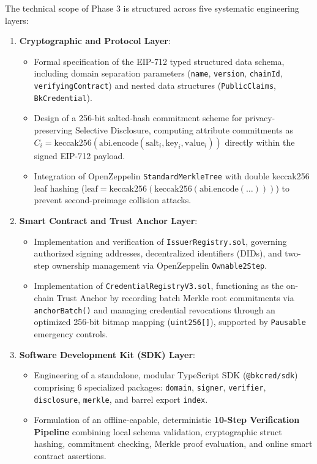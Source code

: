 The technical scope of Phase 3 is structured across five systematic engineering layers:

\begin{enumerate}
    \item \textbf{Cryptographic and Protocol Layer}:
    \begin{itemize}
        \item Formal specification of the EIP-712 typed structured data schema, including domain separation parameters (\texttt{name}, \texttt{version}, \texttt{chainId}, \texttt{verifyingContract}) and nested data structures (\texttt{PublicClaims}, \texttt{BkCredential}).
        \item Design of a 256-bit salted-hash commitment scheme for privacy-preserving Selective Disclosure, computing attribute commitments as $C_i = \text{keccak256}(\text{abi.encode}(\text{salt}_i, \text{key}_i, \text{value}_i))$ directly within the signed EIP-712 payload.
        \item Integration of OpenZeppelin \texttt{StandardMerkleTree} with double keccak256 leaf hashing ($\text{leaf} = \text{keccak256}(\text{keccak256}(\text{abi.encode}(\dots)))$) to prevent second-preimage collision attacks.
    \end{itemize}
    
    \item \textbf{Smart Contract and Trust Anchor Layer}:
    \begin{itemize}
        \item Implementation and verification of \texttt{IssuerRegistry.sol}, governing authorized signing addresses, decentralized identifiers (DIDs), and two-step ownership management via OpenZeppelin \texttt{Ownable2Step}.
        \item Implementation of \texttt{CredentialRegistryV3.sol}, functioning as the on-chain Trust Anchor by recording batch Merkle root commitments via \texttt{anchorBatch()} and managing credential revocations through an optimized 256-bit bitmap mapping (\texttt{uint256[]}), supported by \texttt{Pausable} emergency controls.
    \end{itemize}

    \item \textbf{Software Development Kit (SDK) Layer}:
    \begin{itemize}
        \item Engineering of a standalone, modular TypeScript SDK (\texttt{@bkcred/sdk}) comprising 6 specialized packages: \texttt{domain}, \texttt{signer}, \texttt{verifier}, \texttt{disclosure}, \texttt{merkle}, and barrel export \texttt{index}.
        \item Formulation of an offline-capable, deterministic \textbf{10-Step Verification Pipeline} combining local schema validation, cryptographic struct hashing, commitment checking, Merkle proof evaluation, and online smart contract assertions.
    \end{itemize}


\end{enumerate}
